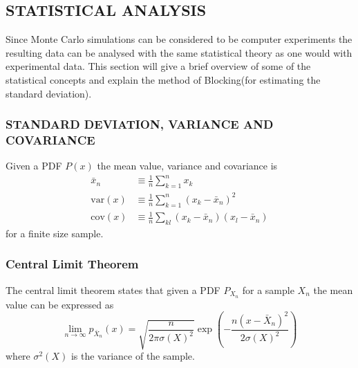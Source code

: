 \documentclass[a4paper, hidelinks, 10pt]{article}
\let\oldsubsection\subsection
\renewcommand{\subsection}[1]{\centering \oldsubsection{{#1}} \justifying}
\newcommand{\rarr}{\rightarrow} %
\newcommand{\suml}[2]{\sum\limits_{#1=1}^{#2}}
\begin{document}
\subsection{STATISTICAL ANALYSIS}
\label{sub:statistical_analysis}
    Since Monte Carlo simulations can be considered to be computer experiments
    the resulting data can be analysed with the same statistical theory as one
    would with experimental data. This section will give a brief overview of
    some of the statistical concepts and explain the method of Blocking(for
    estimating the standard deviation).

\subsubsection{STANDARD DEVIATION, VARIANCE AND COVARIANCE}
\label{ssub:standard_deviation__variance_and_covariance}
    Given a PDF $P(x)$ the mean value, variance and covariance is
        \begin{align}
            \bar{x}_n &\equiv \frac{1}{n}\suml{k}{n} x_k \\
            \text{var}(x) &\equiv
            \frac{1}{n}\suml{k}{n}\left(x_k-\bar{x}_n\right)^2 \\
            \text{cov}(x) &\equiv \frac{1}{n}\sum\limits_{kl}
            \left(x_k-\bar{x}_n\right)\left(x_l-\bar{x}_n\right)
            \label{eq:statfinite}
        \end{align}
    for a finite size sample.

\subsubsection{Central Limit Theorem}
\label{ssub:central_limit_theorem}
    The central limit theorem states that given a PDF $P_{X_n}$ for a sample $X_n$
    the mean value can be expressed as
        \begin{equation}
            \lim\limits_{n\rarr\infty}p_{\bar{X}_n}(x) =
            \sqrt{\frac{n}{2\pi\sigma(X)^2}}
            \exp(-\frac{n(x-\bar{X}_n)^2}{2\sigma(X)^2})
            \label{eq:centrallimit}
        \end{equation}
    where $\sigma^2(X)$ is the variance of the sample.
\end{document}

